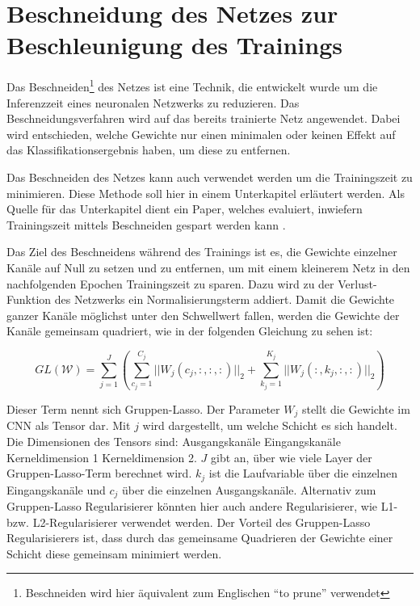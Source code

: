 \section{Beschneidung des Netzes zur Beschleunigung des Trainings}
\label{sec:prunetrain}
Das Beschneiden\footnote{Beschneiden wird hier äquivalent zum Englischen  "`to prune"' verwendet} des Netzes ist eine Technik, die entwickelt wurde um die Inferenzzeit eines neuronalen Netzwerks zu reduzieren. Das Beschneidungsverfahren wird auf das bereits trainierte Netz angewendet. Dabei wird entschieden, welche Gewichte nur einen minimalen oder keinen Effekt auf das Klassifikationsergebnis haben, um diese zu entfernen.

Das Beschneiden des Netzes kann auch verwendet werden um die Trainingszeit zu minimieren. Diese Methode soll hier in einem Unterkapitel erläutert werden. Als Quelle für das Unterkapitel dient ein Paper, welches evaluiert, inwiefern Trainingszeit mittels Beschneiden gespart werden kann \cite{prunetrain}.


Das Ziel des Beschneidens während des Trainings ist es, die Gewichte einzelner Kanäle auf Null zu setzen und zu entfernen, um mit einem kleinerem Netz in den nachfolgenden Epochen Trainingszeit zu sparen. Dazu wird zu der Verlust-Funktion des Netzwerks ein Normalisierungsterm addiert. Damit die Gewichte ganzer Kanäle möglichst unter den Schwellwert fallen, werden die Gewichte der Kanäle gemeinsam quadriert, wie in der folgenden Gleichung zu sehen ist:

\begin{equation}
GL(\mathcal{W})=\sum_{j=1}^{J} \left( \sum_{c_j=1}^{C_j} || W_{j} (c_j,:,:,:) ||_2 + \sum_{k_j=1}^{K_j} || W_{j}(:,k_j,:,:)||_2 \right)
 \label{equ:PTloss}
\end{equation}

Dieser Term nennt sich Gruppen-Lasso. Der Parameter $W_{j}$ stellt die Gewichte im CNN als Tensor dar. Mit $j$ wird dargestellt, um welche Schicht es sich handelt. Die Dimensionen des Tensors sind: Ausgangskanäle \texttimes Eingangskanäle \texttimes Kerneldimension 1 \texttimes Kerneldimension 2. $J$ gibt an, über wie viele Layer der Gruppen-Lasso-Term berechnet wird. $k_j$ ist die Laufvariable über die einzelnen Eingangskanäle und $c_j$ über die einzelnen Ausgangskanäle. Alternativ zum Gruppen-Lasso Regularisierer könnten hier auch andere Regularisierer, wie L1- bzw. L2-Regularisierer verwendet werden. Der Vorteil des Gruppen-Lasso Regularisierers ist, dass durch das gemeinsame Quadrieren der Gewichte einer Schicht diese gemeinsam minimiert werden.


